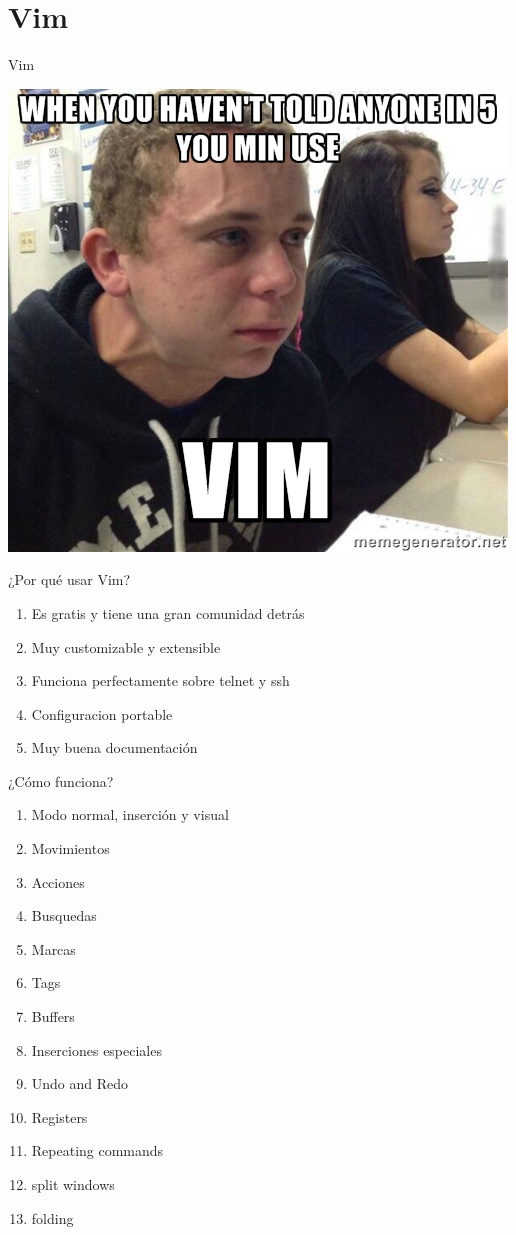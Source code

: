 \documentclass{beamer}
\begin{document}
\section{Vim}
\begin{frame}{Vim}
    \begin{center}
    \includegraphics[height=\paperheight]{vimaddict}
    \end{center}
\end{frame}
\begin{frame}{¿Por qué usar Vim?}
  \begin{enumerate}
  \item Es gratis y tiene una gran comunidad detrás
  \item Muy customizable y extensible
  \item Funciona perfectamente sobre telnet y ssh
  \item Configuracion portable
  \item Muy buena documentación
  \end{enumerate}
\end{frame}

\begin{frame}{¿Cómo funciona?}
  \begin{enumerate}
  \item Modo normal, inserción y visual
  \item Movimientos
  \item Acciones
  \item Busquedas
  \item Marcas
  \item Tags
  \item Buffers
  \item Inserciones especiales
  \item Undo and Redo
  \item Registers
  \item Repeating commands
  \item split windows
  \item folding
  \end{enumerate}
\end{frame}
\end{document}
